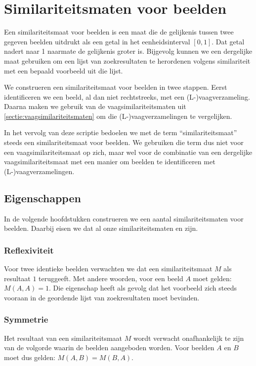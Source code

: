 \chapter{Similariteitsmaten voor beelden}

Een similariteitsmaat voor beelden is een maat die de gelijkenis tussen twee gegeven
beelden uitdrukt als een getal in het eenheidsinterval $[0,1]$. Dat getal nadert naar 1
naarmate de gelijkenis groter is. Bijgevolg kunnen we een dergelijke maat gebruiken om
een lijst van zoekresultaten te herordenen volgens similariteit met een bepaald 
voorbeeld uit die lijst. 

We construeren een similariteitsmaat voor beelden in twee stappen. Eerst identificeren we
een beeld, al dan niet rechtstreeks, met een (L-)vaagverzameling. Daarna maken we gebruik van
de vaagsimilariteitsmaten uit \ref{sectie:vaagsimilariteitsmaten} om die (L-)vaagverzamelingen te
vergelijken. 

In het vervolg van deze scriptie bedoelen we met de term ``similariteitsmaat'' steeds
een similariteitsmaat voor beelden. We gebruiken die term dus niet voor een vaagsimilariteitsmaat
op zich, maar wel voor de combinatie van een dergelijke vaagsimilariteitsmaat met een manier om beelden te 
identificeren met (L-)vaagverzamelingen.

\section{Eigenschappen}

In de volgende hoofdstukken construeren we een aantal similariteitsmaten voor beelden. Daarbij 
eisen we dat al onze similariteitsmaten  en  zijn.

\subsection{Reflexiviteit}

Voor twee identieke beelden verwachten we dat een similariteitsmaat $M$ als resultaat $1$
teruggeeft. Met andere woorden, voor een beeld $A$ moet gelden: $M(A,A)=1$.
Die eigenschap heeft als gevolg dat het voorbeeld zich steeds vooraan in
de geordende lijst van zoekresultaten moet bevinden.

\subsection{Symmetrie}

Het resultaat van een similariteitsmaat $M$ wordt verwacht onafhankelijk te zijn van de 
volgorde waarin de beelden aangeboden worden. Voor beelden $A$ en $B$ moet dus gelden:
$M(A,B)=M(B,A)$.


